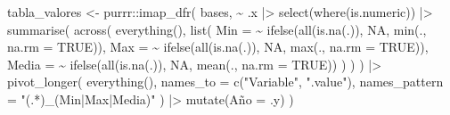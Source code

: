 \documentclass[
  letterpaper,
  DIV=11,
  numbers=noendperiod]{scrartcl}
\newenvironment{Shaded}{\begin{snugshade}}{\end{snugshade}}
\newcommand{\AttributeTok}[1]{\textcolor[rgb]{0.40,0.45,0.13}{#1}}
\newcommand{\ConstantTok}[1]{\textcolor[rgb]{0.56,0.35,0.01}{#1}}
\newcommand{\FunctionTok}[1]{\textcolor[rgb]{0.28,0.35,0.67}{#1}}
\newcommand{\NormalTok}[1]{\textcolor[rgb]{0.00,0.23,0.31}{#1}}
\newcommand{\OtherTok}[1]{\textcolor[rgb]{0.00,0.23,0.31}{#1}}
\newcommand{\SpecialCharTok}[1]{\textcolor[rgb]{0.37,0.37,0.37}{#1}}
\newcommand{\StringTok}[1]{\textcolor[rgb]{0.13,0.47,0.30}{#1}}
\begin{document}
\begin{Shaded}
\begin{Highlighting}[]
\NormalTok{tabla\_valores }\OtherTok{\textless{}{-}}\NormalTok{ purrr}\SpecialCharTok{::}\FunctionTok{imap\_dfr}\NormalTok{(}
\NormalTok{  bases,}
  \SpecialCharTok{\textasciitilde{}}\NormalTok{ .x }\SpecialCharTok{|\textgreater{}}
    \FunctionTok{select}\NormalTok{(}\FunctionTok{where}\NormalTok{(is.numeric)) }\SpecialCharTok{|\textgreater{}}
    \FunctionTok{summarise}\NormalTok{(}
      \FunctionTok{across}\NormalTok{(}
        \FunctionTok{everything}\NormalTok{(),}
        \FunctionTok{list}\NormalTok{(}
          \AttributeTok{Min =} \SpecialCharTok{\textasciitilde{}} \FunctionTok{ifelse}\NormalTok{(}\FunctionTok{all}\NormalTok{(}\FunctionTok{is.na}\NormalTok{(.)), }\ConstantTok{NA}\NormalTok{, }\FunctionTok{min}\NormalTok{(., }\AttributeTok{na.rm =} \ConstantTok{TRUE}\NormalTok{)),}
          \AttributeTok{Max =} \SpecialCharTok{\textasciitilde{}} \FunctionTok{ifelse}\NormalTok{(}\FunctionTok{all}\NormalTok{(}\FunctionTok{is.na}\NormalTok{(.)), }\ConstantTok{NA}\NormalTok{, }\FunctionTok{max}\NormalTok{(., }\AttributeTok{na.rm =} \ConstantTok{TRUE}\NormalTok{)),}
          \AttributeTok{Media =} \SpecialCharTok{\textasciitilde{}} \FunctionTok{ifelse}\NormalTok{(}\FunctionTok{all}\NormalTok{(}\FunctionTok{is.na}\NormalTok{(.)), }\ConstantTok{NA}\NormalTok{, }\FunctionTok{mean}\NormalTok{(., }\AttributeTok{na.rm =} \ConstantTok{TRUE}\NormalTok{))}
\NormalTok{        )}
\NormalTok{      )}
\NormalTok{    ) }\SpecialCharTok{|\textgreater{}}
    \FunctionTok{pivot\_longer}\NormalTok{(}
      \FunctionTok{everything}\NormalTok{(),}
      \AttributeTok{names\_to =} \FunctionTok{c}\NormalTok{(}\StringTok{"Variable"}\NormalTok{, }\StringTok{".value"}\NormalTok{),}
      \AttributeTok{names\_pattern =} \StringTok{"(.*)\_(Min|Max|Media)"}
\NormalTok{    ) }\SpecialCharTok{|\textgreater{}}
    \FunctionTok{mutate}\NormalTok{(Año }\OtherTok{=}\NormalTok{ .y)}
\NormalTok{)}


\end{Highlighting}
\end{Shaded}
\end{document}
